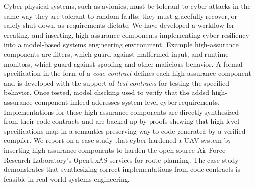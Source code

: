 Cyber-physical systems, such as avionics, must be tolerant to
cyber-attacks in the same way they are tolerant to random faults: they
must gracefully recover, or safely shut down, as requirements dictate.
We have developed a workflow for creating, and inserting,
high-assurance components implementing cyber-resiliency into a
model-based systems engineering environment.  Example high-assurance
components are filters, which guard against malformed input, and
runtime monitors, which guard against spoofing and other malicious
behavior. A formal specification in the form of a \emph{code contract}
defines each high-assurance component and is developed with the
support of \emph{test contracts} for testing the specified behavior.
Once tested, model checking used to verify that the added
high-assurance component indeed addresses system-level cyber
requirements.  Implementations for these high-assurance components are
directly synthesized from their code contracts and are backed up by
proofs showing that high-level specifications map in a
semantics-preserving way to code generated by a verified compiler.  We
report on a case study that cyber-hardened a UAV system by inserting
high assurance components to harden the open source Air Force Research
Laboratory's OpenUxAS services for route planning.  The case study
demonstrates that synthesizing correct implementations from code
contracts is feasible in real-world systems engineering.
